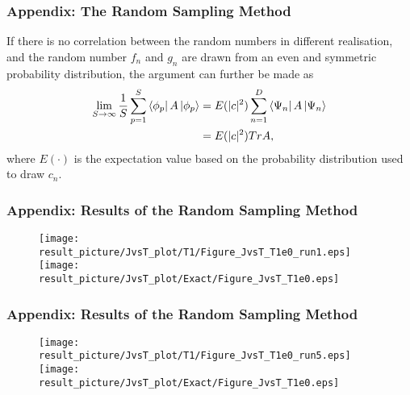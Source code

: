 \documentclass{beamer}
\begin{document}
\begin{frame}
	\frametitle{Appendix: The Random Sampling Method}
	If there is no correlation between the random numbers in different realisation, and the random number $f_n$ and $g_n$ are drawn from an even and symmetric probability distribution, the argument can further be made as
	\begin{equation*}
	\begin{split}
	\lim_{S \to \infty} \frac{1}{S} \sum_{p=1}^{S}  \bra{\phi_p}A\ket{\phi_p} &= E(|c|^2)\sum_{n=1}^{D}\bra{\Psi_n}A\ket{\Psi_n}\\
	&=E(|c|^2) TrA,
	\end{split}
	\end{equation*}
	where $E(\cdot)$ is the expectation value based on the probability distribution used to draw $c_n$.
	
	
	
	
\end{frame}


\begin{frame}
	\frametitle{Appendix: Results of the Random Sampling Method}
	\begin{figure}
		\centering
		\texttt{[image: result\_picture/JvsT\_plot/T1/Figure\_JvsT\_T1e0\_run1.eps]}
		\hfill
		\texttt{[image: result\_picture/JvsT\_plot/Exact/Figure\_JvsT\_T1e0.eps]}		
		
	\end{figure}
\end{frame}

\begin{frame}
	\frametitle{Appendix: Results of the Random Sampling Method}
	\begin{figure}
		\centering
		\texttt{[image: result\_picture/JvsT\_plot/T1/Figure\_JvsT\_T1e0\_run5.eps]}
		\hfill
		\texttt{[image: result\_picture/JvsT\_plot/Exact/Figure\_JvsT\_T1e0.eps]}		
		
	\end{figure}
\end{frame}
\end{document}
